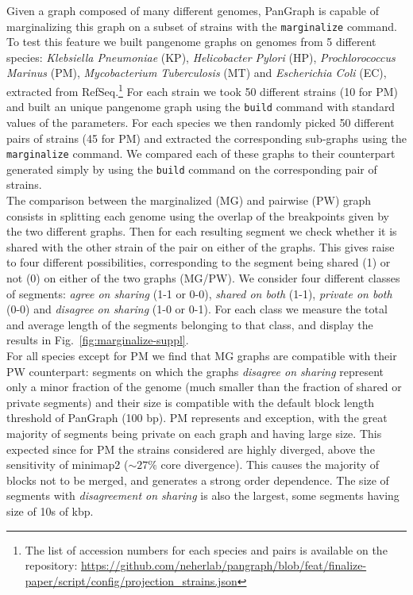 \documentclass[aps,rmp,reprint,superscriptaddress,notitlepage,10pt,onecolumn]{revtex4-1}
\begin{document}
Given a graph composed of many different genomes, PanGraph is capable of marginalizing this graph on a subset of strains with the \verb|marginalize| command. To test this feature we built pangenome graphs on genomes from 5 different species: \textit{Klebsiella Pneumoniae} (KP), \textit{Helicobacter Pylori} (HP), \textit{Prochlorococcus Marinus} (PM), \textit{Mycobacterium Tuberculosis} (MT) and \textit{Escherichia Coli} (EC), extracted from RefSeq.\footnote{The list of accession numbers for each species and pairs is available on the repository: \url{https://github.com/neherlab/pangraph/blob/feat/finalize-paper/script/config/projection_strains.json}} For each strain we took 50 different strains (10 for PM) and built an unique pangenome graph using the \verb|build| command with standard values of the parameters. For each species we then randomly picked 50 different pairs of strains (45 for PM) and extracted the corresponding sub-graphs using the \verb|marginalize| command. We compared each of these graphs to their counterpart generated simply by using the \verb|build| command on the corresponding pair of strains.\\
The comparison between the marginalized (MG) and pairwise (PW) graph consists in splitting each genome using the overlap of the breakpoints given by the two different graphs. Then for each resulting segment we check whether it is shared with the other strain of the pair on either of the graphs. This gives raise to four different possibilities, corresponding to the segment being shared (1) or not (0) on either of the two graphs (MG/PW). We consider four different classes of segments: \textit{agree on sharing} (1-1 or 0-0), \textit{shared on both} (1-1), \textit{private on both} (0-0) and \textit{disagree on sharing} (1-0 or 0-1). For each class we measure the total and average length of the segments belonging to that class, and display the results in Fig.~\ref{fig:marginalize-suppl}.\\
For all species except for PM we find that MG graphs are compatible with their PW counterpart: segments on which the graphs \textit{disagree on sharing} represent only a minor fraction of the genome (much smaller than the fraction of shared or private segments) and their size is compatible with the default block length threshold of PanGraph (100 bp). PM represents and exception, with the great majority of segments being private on each graph and having large size. This expected since for PM the strains considered are highly diverged, above the sensitivity of minimap2 ($\sim 27\%$ core divergence). This causes the majority of blocks not to be merged, and generates a strong order dependence. The size of segments with \textit{disagreement on sharing} is also the largest, some segments having size of 10s of kbp.
\end{document}
